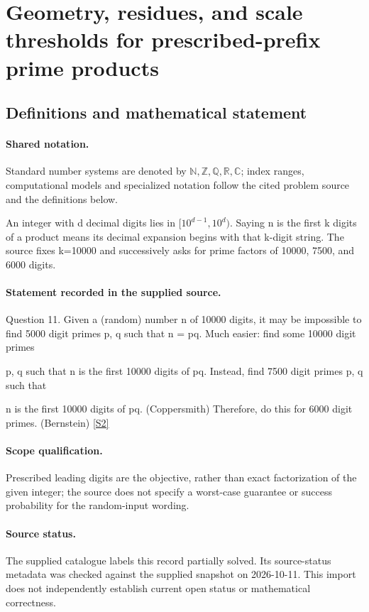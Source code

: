 \documentclass[11pt]{article}
\newcommand{\sref}[2]{\hyperlink{source:#1:#2}{[S#2]}}
\begin{document}
\section{Geometry, residues, and scale thresholds for prescribed-prefix prime products}\label{statement}

\subsection{Definitions and mathematical statement}

\paragraph{Shared notation.}Standard number systems are denoted by $\mathbb N,\mathbb Z,\mathbb Q,\mathbb R,\mathbb C$; index ranges, computational models and specialized notation follow the cited problem source and the definitions below.


An integer with d decimal digits lies in $[10^{d-1},10^d)$. Saying n is the first k digits of a product means its decimal expansion begins with that k-digit string. The source fixes k=10000 and successively asks for prime factors of 10000, 7500, and 6000 digits.
\paragraph{Statement recorded in the supplied source.}
Question 11. Given a (random) number n of 10000 digits, it may be impossible to find 5000 digit primes p, q such that n = pq. Much easier: find some 10000 digit primes

p, q such that n is the first 10000 digits of pq. Instead, find 7500 digit primes p, q such that

n is the first 10000 digits of pq. (Coppersmith) Therefore, do this for 6000 digit primes. (Bernstein) \sref{statement}{2}
\paragraph{Scope qualification.}
Prescribed leading digits are the objective, rather than exact factorization of the given integer; the source does not specify a worst-case guarantee or success probability for the random-input wording.
\paragraph{Source status.}
The supplied catalogue labels this record partially solved. Its source-status metadata was checked against the supplied snapshot on 2026-10-11. This import does not independently establish current open status or mathematical correctness.
\end{document}
